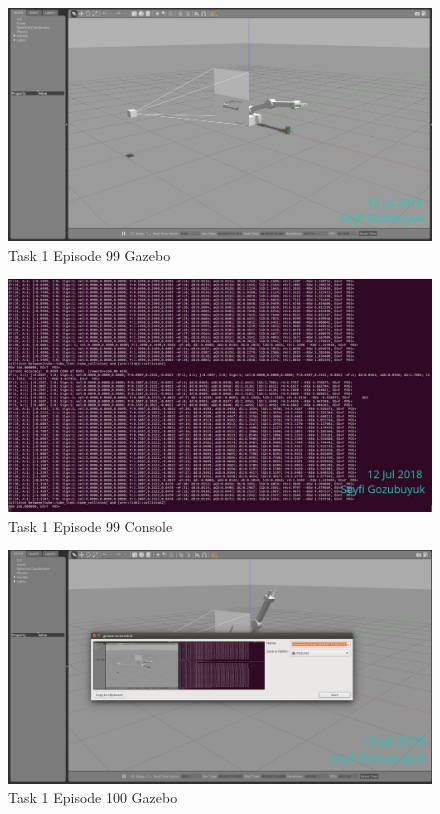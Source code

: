 \documentclass[10pt,journal,compsoc]{IEEEtran}
\begin{document}
\begin{figure}[thpb]
      \centering
      \includegraphics[width=\linewidth]{figures/Task1_Step99_1.png}
      \caption{Task 1 Episode 99 Gazebo}
      \label{fig:t1s991}
\end{figure}

\begin{figure}[thpb]
      \centering
      \includegraphics[width=\linewidth]{figures/Task1_Step99_2.png}
      \caption{Task 1 Episode 99 Console}
      \label{fig:t1s992}
\end{figure}

\begin{figure}[thpb]
      \centering
      \includegraphics[width=\linewidth]{figures/Task1_Step100_1.png}
      \caption{Task 1 Episode 100 Gazebo}
      \label{fig:t1s1001}
\end{figure}
\end{document}
